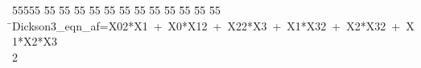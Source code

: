 %
%
\begin{tabbing}
55555 \= 55 \= 55 \= 55 \= 55 \= 55 \= 55 \= 55 \= 55 \= 55 \= 55 \= 55 \= 55 \= \>Dickson3\_eqn\_af=X02*X1\ +\ X0*X12\ +\ X22*X3\ +\ X1*X32\ +\ X2*X32\ +\ X1*X2*X3\\[0pt]
2\>\end{tabbing}
